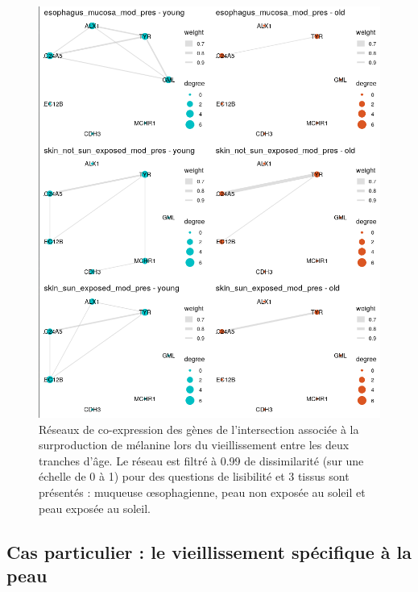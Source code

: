 \begin{figure}[p]
    \centering
    \includegraphics[width=1\textwidth]{img/chap2/chap2_graphs_intersection_melanine.png}
    \caption[Réseaux de co-expression des gènes de l'intersection associée à la surproduction de mélanine lors du vieillissement entre les deux tranches d'âge]{Réseaux de co-expression des gènes de l'intersection associée à la surproduction de mélanine lors du vieillissement entre les deux tranches d'âge. Le réseau est filtré à 0.99 de dissimilarité (sur une échelle de 0 à 1) pour des questions de lisibilité et 3 tissus sont présentés : muqueuse œsophagienne, peau non exposée au soleil et peau exposée au soleil.}
    \label{figure:graphs_intersection_melanine}
\end{figure}


\subsection{Cas particulier : le vieillissement spécifique à la peau}


